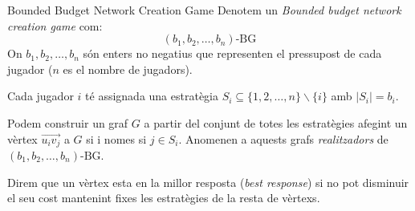 \documentclass[aspectratio=169]{beamer}
\begin{document}
\begin{frame}{Bounded Budget Network Creation Game}
    Denotem un \emph{Bounded budget network creation game} com:
    $$ (b_1, b_2, \dots , b_n)\text{-BG} $$
    On $b_1,b_2, \dots , b_n$ són enters no negatius que representen el pressupost de cada jugador ($n$ es el nombre de jugadors).
    
    \vspace{1em}
    
    Cada jugador $i$ té assignada una estratègia $S_i \subseteq \{1, 2, \dots , n\} \backslash \{i\}$ amb
    $|S_i| = b_i$.
    
    \vspace{1em}
    
    Podem construir un graf $G$ a partir del conjunt de totes les estratègies afegint un vèrtex $\overrightarrow{u_iv_j}$
    a $G$ si i nomes si $j \in S_i$. Anomenen a aquests grafs \emph{realitzadors} de
    $ (b_1, b_2, \dots , b_n)\text{-BG} $.
    
    \vspace{1em}
    
    Direm que un vèrtex esta en la millor resposta (\emph{best response}) si no pot disminuir el seu
    cost mantenint fixes les estratègies de la resta de vèrtexs.
\end{frame}
\end{document}
